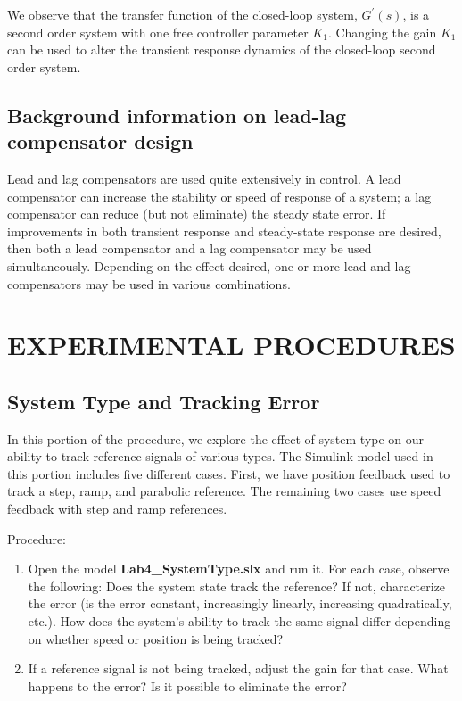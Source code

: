 \documentclass[11pt,a4paper]{article}
\begin{document}
We observe that the transfer function of the closed-loop system, $G^{\prime}(s)$, is a second order system with one free controller parameter $K_{1}$. Changing the gain $K_{1}$ can be used to alter the transient response dynamics of the closed-loop second order system.


\subsection{Background information on lead-lag compensator design}
Lead and lag compensators are used quite extensively in control. A lead compensator can increase the stability or speed of response of a system; a lag compensator can reduce (but not eliminate) the steady state error. If improvements in both transient response and steady-state response are desired, then both a lead compensator and a lag compensator may be used simultaneously. Depending on the effect desired, one or more lead and lag compensators may be used in various combinations.



\section{EXPERIMENTAL PROCEDURES}

\subsection{System Type and Tracking Error}
In this portion of the procedure, we explore the effect of system type on our ability to track reference signals of various types. The Simulink model used in this portion includes five different cases. First, we have position feedback used to track a step, ramp, and parabolic reference. The remaining two cases use speed feedback with step and ramp references. 

Procedure:
\begin{enumerate}
\item Open the model \textbf{Lab4\_SystemType.slx} and run it. For each case, observe the following: Does the system state track the reference? If not, characterize the error (is the error constant, increasingly linearly, increasing quadratically, etc.). How does the system's ability to track the same signal differ depending on whether speed or position is being tracked?

\item If a reference signal is not being tracked, adjust the gain for that case. What happens to the error? Is it possible to eliminate the error?
\end{enumerate}
\end{document}
